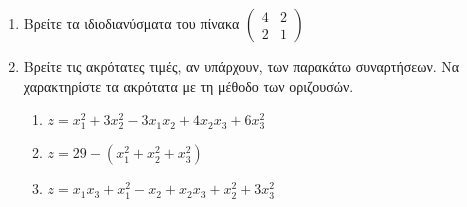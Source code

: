 \documentclass[a4paper,table]{report}
\begin{document}
\begin{enumerate}
\item Βρείτε τα ιδιοδιανύσματα του πίνακα $\begin{pmatrix}
4 & 2\\
2 & 1
\end{pmatrix}$

\item Βρείτε τις ακρότατες τιμές, αν υπάρχουν, των παρακάτω συναρτήσεων. Να χαρακτηρίστε τα ακρότατα με τη μέθοδο των οριζουσών.

\begin{enumerate}
\item $z=x_1^2+3x_2^2-3x_1x_2+4x_2x_3+6x_3^2$
\item $z=29 - (x_1^2+x_2^2+x_3^2)$
\item $z=x_1x_3 + x_1^2-x_2 + x_2x_3+x_2^2+3x_3^2$
\end{enumerate}









\end{enumerate}
\end{document}
